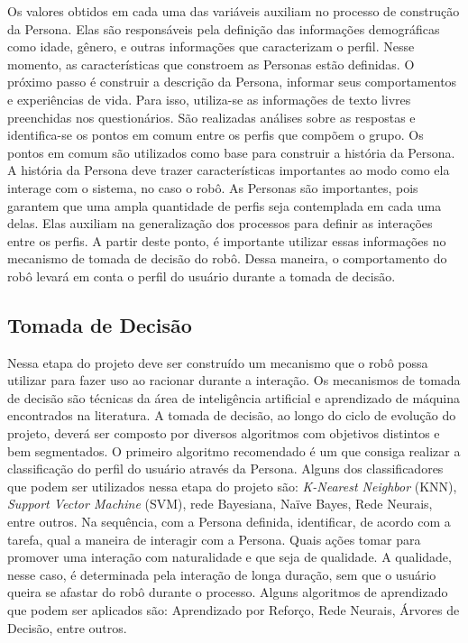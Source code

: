 Os valores obtidos em cada uma das variáveis auxiliam no processo de construção da Persona. Elas são responsáveis pela definição das informações demográficas como idade, gênero, e outras informações que caracterizam o perfil. Nesse momento, as características que constroem as Personas estão definidas. O próximo passo é construir a descrição da Persona, informar seus comportamentos e experiências de vida. Para isso, utiliza-se as informações de texto livres preenchidas nos questionários. São realizadas análises sobre as respostas e identifica-se os pontos em comum entre os perfis que compõem o grupo. Os pontos em comum são utilizados como base para construir a história da Persona. A história da Persona deve trazer características importantes ao modo como ela interage com o sistema, no caso o robô. As Personas são importantes, pois garantem que uma ampla quantidade de perfis seja contemplada em cada uma delas. Elas auxiliam na generalização dos processos para definir as interações entre os perfis. A partir deste ponto, é importante utilizar essas informações no mecanismo de tomada de decisão do robô. Dessa maneira, o comportamento do robô levará em conta o perfil do usuário durante a tomada de decisão.

\subsection{Tomada de Decisão}
\label{sec:tomadadecisao}
Nessa etapa do projeto deve ser construído um mecanismo que o robô possa utilizar para fazer uso ao racionar durante a interação. Os mecanismos de tomada de decisão são técnicas da área de inteligência artificial e aprendizado de máquina encontrados na literatura. A tomada de decisão, ao longo do ciclo de evolução do projeto, deverá ser composto por diversos algoritmos com objetivos distintos e bem segmentados. O primeiro algoritmo recomendado é um que consiga realizar a classificação do perfil do usuário através da Persona. Alguns dos classificadores que podem ser utilizados nessa etapa do projeto são: \textit{K-Nearest Neighbor} (KNN), \textit{Support Vector Machine} (SVM), rede Bayesiana, Naïve Bayes, Rede Neurais, entre outros. Na sequência, com a Persona definida, identificar, de acordo com a tarefa, qual a maneira de interagir com a Persona.  Quais ações tomar para promover uma interação com naturalidade e que seja de qualidade. A qualidade, nesse caso, é determinada pela interação de longa duração, sem que o usuário queira se afastar do robô durante o processo. Alguns algoritmos de aprendizado que podem ser aplicados são: Aprendizado por Reforço, Rede Neurais, Árvores de Decisão, entre outros.

